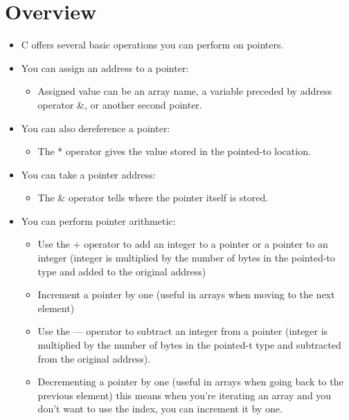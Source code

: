 \section{Overview}
\begin{itemize}
    \item C offers several basic operations you can perform on pointers.
    \item You can assign an address to a pointer:
        \begin{itemize}
            \item Assigned value can be an array name, a variable preceded by address operator \&, or another second pointer. 
        \end{itemize}
    
    \item You can also dereference a pointer: 
        \begin{itemize}
            \item The * operator gives the value stored in the pointed-to location.
        \end{itemize}
    
    \item You can take a pointer address:
        \begin{itemize}
            \item The \& operator tells where the pointer itself is stored.
        \end{itemize}
    
    \item You can perform pointer arithmetic:
        \begin{itemize}
            \item Use the + operator to add an integer to a pointer or a pointer to an integer (integer is multiplied by the number of bytes in the pointed-to type and added to the original address) 
            \item Increment a pointer by one (useful in arrays when moving to the next element)
            \item Use the — operator to subtract an integer from a pointer (integer is multiplied by the number of bytes in the pointed-t type and subtracted from the original address).
            \item Decrementing a pointer by one (useful in arrays when going back to the previous element) this means when you're iterating an array and you don't want to use the index, you can increment it by one. 
        \end{itemize}
    

\end{itemize}

